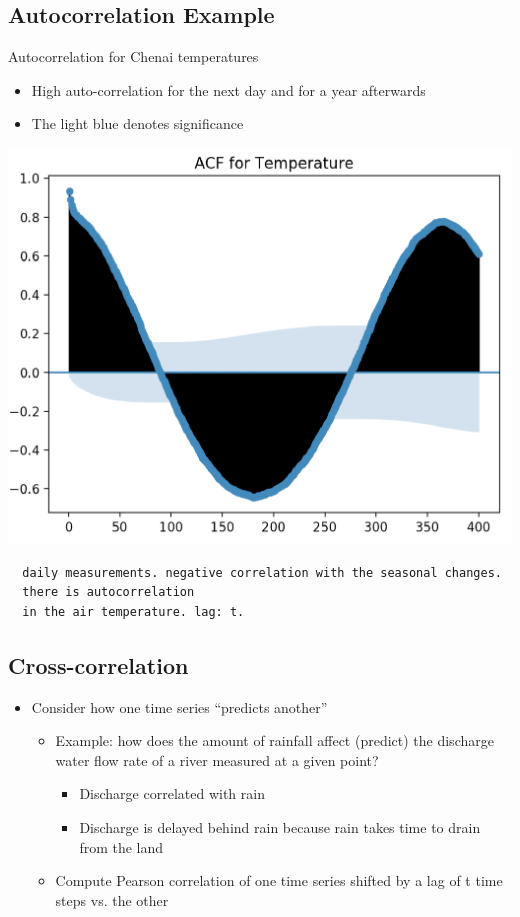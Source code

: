 \documentclass[11pt]{article}
\theoremstyle{definition}
\begin{document}
\subsection{Autocorrelation Example}
Autocorrelation for
Chenai temperatures

\begin{itemize}
  \item High auto-correlation
  for the next day and
  for a year afterwards
  \item The light blue
  denotes significance
\end{itemize}

\includegraphics[width=\textwidth/2]{9.png}
\begin{verbatim}
  daily measurements. negative correlation with the seasonal changes. 
  there is autocorrelation
  in the air temperature. lag: t.
\end{verbatim}

\subsection{Cross-correlation}
\begin{itemize}
  \item Consider how one time
  series “predicts another”
  \begin{itemize}
    \item Example: how does the
    amount of rainfall affect
    (predict) the discharge water
    flow rate of a river measured
    at a given point?
    \begin{itemize}
      \item Discharge correlated with rain
      \item Discharge is delayed behind
      rain because rain takes time
      to drain from the land
    \end{itemize}
   \item  Compute Pearson
   correlation of one time
   series shifted by a lag of t
   time steps vs. the other
  \end{itemize}
\end{itemize}
\end{document}
